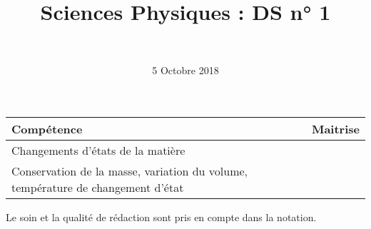 \documentclass[a4paper,11pt]{exam}
\author{\ }
\date{5 Octobre 2018}
\title{Sciences Physiques : DS n° 1}
\begin{document}
%	

	\maketitle
	
\begin{small}
	\begin{center}
		\begin{tabular}{|@{\ }l@{}|@{\ }c@{\ }|}
			\hline
			\textbf{Compétence} & \textbf{Maitrise} \\
			\hline
			Changements d’états de la matière \ &  \ \ \ \\
			\hline
			Conservation de la masse, variation du volume, température de changement d’état \ &  \ \ \ \\
			\hline
		\end{tabular}
	\end{center}
\end{small}	
	
	

%

%

Le soin et la qualité de rédaction sont pris en compte dans la notation.


%





%

%

 



\newpage







\ \label{LastPage}
\end{document}

